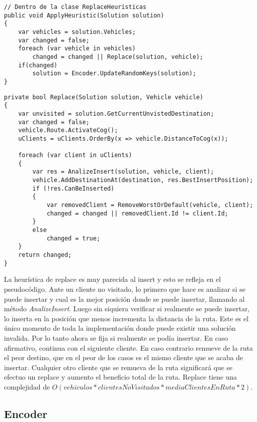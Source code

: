 \begin{minipage}{\textwidth}
\begin{lstlisting}
// Dentro de la clase ReplaceHeuristicas
public void ApplyHeuristic(Solution solution)
{	
	var vehicles = solution.Vehicles;
	var changed = false;	
	foreach (var vehicle in vehicles)
		changed = changed || Replace(solution, vehicle);
	if(changed)
		solution = Encoder.UpdateRandomKeys(solution);
}
\end{lstlisting}
\end{minipage}

\begin{minipage}{\textwidth}
\begin{lstlisting}
private bool Replace(Solution solution, Vehicle vehicle)
{
	var unvisited = solution.GetCurrentUnvistedDestination;
	var changed = false;
	vehicle.Route.ActivateCog();
	uClients = uClients.OrderBy(x => vehicle.DistanceToCog(x));	

	foreach (var client in uClients)
	{
		var res = AnalizeInsert(solution, vehicle, client);
		vehicle.AddDestinationAt(destination, res.BestInsertPosition);
		if (!res.CanBeInserted)
		{
			var removedClient = RemoveWorstOrDefault(vehicle, client);
			changed = changed || removedClient.Id != client.Id;
		}
		else
			changed = true;
	}
	return changed;
}
\end{lstlisting}
\end{minipage}

\bigskip

La heurística de replace es muy parecida al insert y esto se refleja en el pseudocódigo. Ante un cliente no visitado, lo primero que hace es analizar si se puede insertar y cual es la mejor posición donde se puede insertar, llamando al método \textit{AnalizeInsert}. Luego sin siquiera verificar si realmente se puede insertar, lo inserta en la posición que menos incrementa la distancia de la ruta. Este es el único momento de toda la implementación donde puede existir una solución invalida. Por lo tanto ahora se fija si realmente se podía insertar. En caso afirmativo, continua con el siguiente cliente. En caso contrario remueve de la ruta el peor destino, que en el peor de los casos es el mismo cliente que se acaba de insertar. Cualquier otro cliente que se remueva de la ruta significará que se efectuo un replace y aumento el beneficio total de la ruta. Replace tiene una complejidad de $O(vehiculos * clientesNoVisitados * mediaClientesEnRuta * 2)$. 

\subsection{Encoder}

